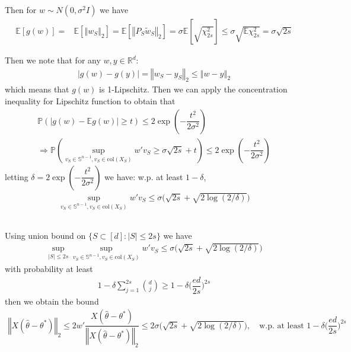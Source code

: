 \documentclass[11pt,a4paper]{article}
\numberwithin{equation}{section}%
\begin{document}
Then for $ w\sim N(0,\sigma ^2I) $ we have 
\begin{align*}
    \mathbb{E}\left[ g(w) \right] = & \mathbb{E}\left[ \left\Vert w_S \right\Vert _2 \right] = \mathbb{E}\left[ \left\Vert P_S\tilde{w}_S \right\Vert _2 \right]  = \sigma \mathbb{E}\left[ \sqrt{\chi^2_{2s}}  \right]  \leq \sigma \sqrt{\mathbb{E}\chi^2_{2s}}= \sigma \sqrt{2s}
\end{align*}


Then we note that for any $ w,y \in \mathbb{R}^d $:
\begin{align*}
    \left\vert g(w)-g(y) \right\vert =\left\Vert w_S-y_S \right\Vert _2 \leq \left\Vert w-y \right\Vert _2
\end{align*}
which means that $ g(w) $ is 1-Lipschitz. Then we can apply the concentration inequality for Lipschitz function to obtain that 
\begin{align*}
    \mathbb{P}\left( \left\vert g(w) -\mathbb{E}g(w) \right\vert \geq t \right) \leq 2\exp\left( -\dfrac{ t^2 }{ 2\sigma ^2 }  \right)\\
     \Rightarrow \mathbb{P}\left( \mathop{ \sup  }\limits_{v_S\in \mathbb{S}^{n-1}, v_S\in \mathrm{ col  } (X_S)} w'v_S \geq \sigma \sqrt{2s} + t \right) \leq 2\exp\left( -\dfrac{ t^2 }{ 2\sigma ^2 }  \right)
\end{align*}
letting $ \delta  = 2\exp\left( -\dfrac{ t^2 }{ 2\sigma ^2 }  \right) $ we have: w.p. at least $ 1-\delta  $, 
\begin{align*}
    \mathop{ \sup  }\limits_{v_S\in \mathbb{S}^{n-1}, v_S\in \mathrm{ col  } (X_S)} w'v_S \leq \sigma \bigl( \sqrt{2s} + \sqrt{2\log (2/\delta )} \bigr)
\end{align*}


\subsection{}
Using union bound on $ \{S\subset [d]: \left\vert S  \right\vert \leq 2s\} $ we have
\begin{align*}
    \mathop{ \sup  }\limits_{\left\vert S  \right\vert \leq 2s }\mathop{ \sup  }\limits_{v_S\in \mathbb{S}^{n-1}, v_S\in \mathrm{ col  } (X_S)} w'v_S \leq \sigma \bigl( \sqrt{2s} + \sqrt{2\log (2/\delta )} \bigr)
\end{align*}
with probability at least 
\begin{align*}
    1- \delta \sum_{j=1}^{2s} \binom{d}{j} \geq 1- \delta \bigl(\dfrac{ ed }{ 2s } \bigr)^{2s}
\end{align*}
then we obtain the bound
\begin{align*}
    \left\Vert X(\hat{\theta }-\theta ^*) \right\Vert _2 \leq 2w'\dfrac{ X(\hat{\theta }-\theta ^*)  }{ \left\Vert X(\hat{\theta }-\theta ^*) \right\Vert _2 } \leq 2\sigma \bigl( \sqrt{2s} + \sqrt{2\log (2/\delta )} \bigr)  ,\quad \text{w.p. at least } 1- \delta \bigl(\dfrac{ ed }{ 2s } \bigr)^{2s}
\end{align*}
\end{document}
